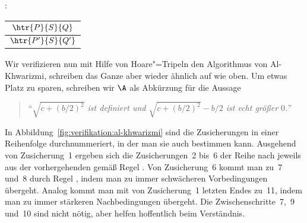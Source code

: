 : \quad \begin{tabular}{c}
                $\htr{P}{S}{Q}$\\
                \midrule
                $\htr{P'}{S}{Q'}$
              \end{tabular}

Wir verifizieren nun mit Hilfe von Hoare"=Tripeln den Algorithmus von
Al-Khwarizmi, schreiben das Ganze aber wieder ähnlich auf wie oben.
%
Um etwas Platz zu sparen, schreiben wir $\A$ als Abkürzung für die Aussage
%
\begin{quote}
"`\emph{$\sqrt{c+(b/2)^2}$ ist definiert und $\sqrt{c+(b/2)^2}-b/2$ ist echt
    größer $0$.}"'
\end{quote}
%
In Abbildung~\ref{fig:verifikation:al-khwarizmi} sind die
Zusicherungen in einer Reihenfolge durchnummeriert, in der man sie
auch bestimmen kann.
%
Ausgehend von Zusicherung~1 ergeben sich die Zusicherungen~2 bis~6 der Reihe
nach jeweils aus der vorhergehenden gemäß Regel .
%
Von Zusicherung~6 kommt man zu~7 und~8 durch Regel , indem man zu immer
schwächeren  Vorbedingungen übergeht.
%
Analog kommt man mit  von Zusicherung~1 letzten Endes zu~11, indem man zu
immer stärkeren Nachbedingungen übergeht.
%
Die Zwischenschritte~7,~9 und~10 sind nicht nötig, aber helfen hoffentlich
beim Verständnis.

